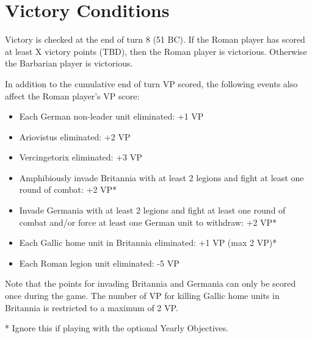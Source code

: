 \section{Victory Conditions}
\par
Victory is checked at the end of turn 8 (51 BC). If the Roman player has scored at least X victory points (TBD), then the Roman player is victorious. Otherwise the Barbarian player is victorious.

In addition to the cumulative end of turn VP scored, the following events also affect the Roman player's VP score:

\begin{itemize}
  \setlength\itemsep{0em}
  \item Each German non-leader unit eliminated: +1 VP
  \item Ariovistus eliminated: +2 VP
  \item Vercingetorix eliminated: +3 VP
  \item Amphibiously invade Britannia with at least 2 legions and fight at least one round of combat: +2 VP*
  \item Invade Germania with at least 2 legions and fight at least one round of combat and/or force at least one German unit to withdraw: +2 VP*
  \item Each Gallic home unit in Britannia eliminated: +1 VP (max 2 VP)*
  \item Each Roman legion unit eliminated: -5 VP
\end{itemize}

Note that the points for invading Britannia and Germania can only be scored once during the game. The number of VP for killing Gallic home units in Britannia is restricted to a maximum of 2 VP.

* Ignore this if playing with the optional Yearly Objectives.